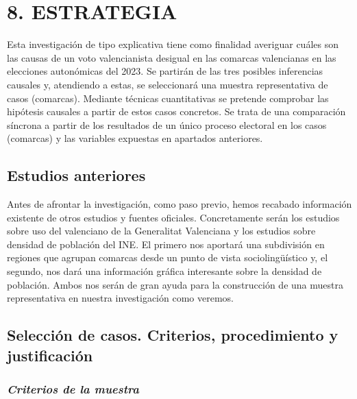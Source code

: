 \documentclass[
]{article}
\begin{document}
\hypertarget{estrategia}{%
\section{8. ESTRATEGIA}\label{estrategia}}

Esta investigación de tipo explicativa tiene como finalidad averiguar
cuáles son las causas de un voto valencianista desigual en las comarcas
valencianas en las elecciones autonómicas del 2023. Se partirán de las
tres posibles inferencias causales y, atendiendo a estas, se
seleccionará una muestra representativa de casos (comarcas). Mediante
técnicas cuantitativas se pretende comprobar las hipótesis causales a
partir de estos casos concretos. Se trata de una comparación síncrona a
partir de los resultados de un único proceso electoral en los casos
(comarcas) y las variables expuestas en apartados anteriores.

\hypertarget{estudios-anteriores}{%
\subsection{Estudios anteriores}\label{estudios-anteriores}}

Antes de afrontar la investigación, como paso previo, hemos recabado
información existente de otros estudios y fuentes oficiales.
Concretamente serán los estudios sobre uso del valenciano de la
Generalitat Valenciana y los estudios sobre densidad de población del
INE. El primero nos aportará una subdivisión en regiones que agrupan
comarcas desde un punto de vista sociolingüístico y, el segundo, nos
dará una información gráfica interesante sobre la densidad de población.
Ambos nos serán de gran ayuda para la construcción de una muestra
representativa en nuestra investigación como veremos.

\hypertarget{selecciuxf3n-de-casos.-criterios-procedimiento-y-justificaciuxf3n}{%
\subsection{Selección de casos. Criterios, procedimiento y
justificación}\label{selecciuxf3n-de-casos.-criterios-procedimiento-y-justificaciuxf3n}}

\hypertarget{criterios-de-la-muestra}{%
\subsubsection{\texorpdfstring{\emph{Criterios de la
muestra}}{Criterios de la muestra}}\label{criterios-de-la-muestra}}
\end{document}
